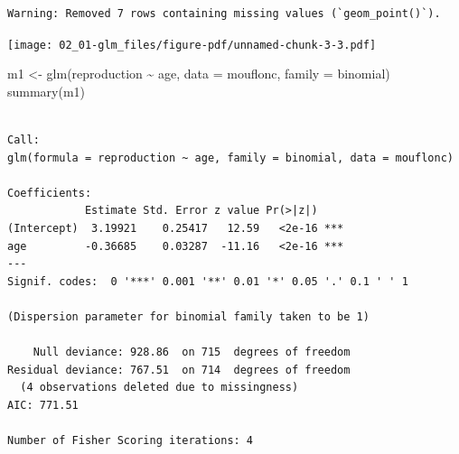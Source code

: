 \documentclass[
  letterpaper,
  DIV=11,
  numbers=noendperiod]{scrreprt}
\newenvironment{Shaded}{\begin{snugshade}}{\end{snugshade}}
\newcommand{\AttributeTok}[1]{\textcolor[rgb]{0.40,0.45,0.13}{#1}}
\newcommand{\ConstantTok}[1]{\textcolor[rgb]{0.56,0.35,0.01}{#1}}
\newcommand{\DecValTok}[1]{\textcolor[rgb]{0.68,0.00,0.00}{#1}}
\newcommand{\FunctionTok}[1]{\textcolor[rgb]{0.28,0.35,0.67}{#1}}
\newcommand{\NormalTok}[1]{\textcolor[rgb]{0.00,0.23,0.31}{#1}}
\newcommand{\OtherTok}[1]{\textcolor[rgb]{0.00,0.23,0.31}{#1}}
\newcommand{\SpecialCharTok}[1]{\textcolor[rgb]{0.37,0.37,0.37}{#1}}
\begin{document}
\begin{Shaded}
\end{Shaded}

\begin{verbatim}
Warning: Removed 7 rows containing missing values (`geom_point()`).
\end{verbatim}

\texttt{[image: 02\_01-glm\_files/figure-pdf/unnamed-chunk-3-3.pdf]}

\begin{Shaded}
\begin{Highlighting}[]
\NormalTok{m1 }\OtherTok{\textless{}{-}} \FunctionTok{glm}\NormalTok{(reproduction }\SpecialCharTok{\textasciitilde{}}\NormalTok{ age,}
    \AttributeTok{data =}\NormalTok{ mouflonc,}
    \AttributeTok{family =}\NormalTok{ binomial)}
\FunctionTok{summary}\NormalTok{(m1)}
\end{Highlighting}
\end{Shaded}

\begin{verbatim}

Call:
glm(formula = reproduction ~ age, family = binomial, data = mouflonc)

Coefficients:
            Estimate Std. Error z value Pr(>|z|)    
(Intercept)  3.19921    0.25417   12.59   <2e-16 ***
age         -0.36685    0.03287  -11.16   <2e-16 ***
---
Signif. codes:  0 '***' 0.001 '**' 0.01 '*' 0.05 '.' 0.1 ' ' 1

(Dispersion parameter for binomial family taken to be 1)

    Null deviance: 928.86  on 715  degrees of freedom
Residual deviance: 767.51  on 714  degrees of freedom
  (4 observations deleted due to missingness)
AIC: 771.51

Number of Fisher Scoring iterations: 4
\end{verbatim}
\end{document}
